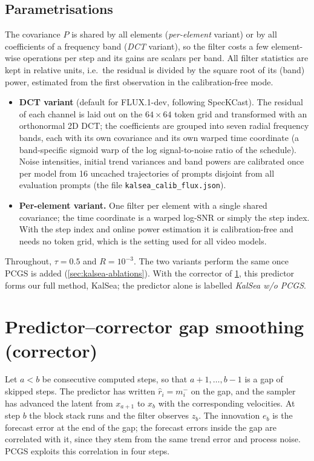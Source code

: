 \subsection{Parametrisations}
The covariance $P$ is shared by all elements (\emph{per-element} variant) or by all coefficients of a frequency band (\emph{DCT} variant), so the filter costs a few element-wise operations per step and its gains are scalars per band. All filter statistics are kept in relative units, i.e.\ the residual is divided by the square root of its (band) power, estimated from the first observation in the calibration-free mode.
\begin{itemize}
  \item \textbf{DCT variant} (default for FLUX.1-dev, following SpecKCast). The residual of each channel is laid out on the $64\times64$ token grid and transformed with an orthonormal 2D DCT; the coefficients are grouped into seven radial frequency bands, each with its own covariance and its own warped time coordinate (a band-specific sigmoid warp of the log signal-to-noise ratio of the schedule). Noise intensities, initial trend variances and band powers are calibrated once per model from 16 uncached trajectories of prompts disjoint from all evaluation prompts (the file \texttt{kalsea\_calib\_flux.json}).
  \item \textbf{Per-element variant.} One filter per element with a single shared covariance; the time coordinate is a warped log-SNR or simply the step index. With the step index and online power estimation it is calibration-free and needs no token grid, which is the setting used for all video models.
\end{itemize}
Throughout, $\tau=0.5$ and $R=10^{-3}$. The two variants perform the same once PCGS is added (\cref{sec:kalsea-ablations}). With the corrector of \cref{sec:kalsea-pcgs}, this predictor forms our full method, KalSea; the predictor alone is labelled \emph{KalSea w/o PCGS}.

\section{Predictor--corrector gap smoothing (corrector)}\label{sec:kalsea-pcgs}

Let $a<b$ be consecutive computed steps, so that $a{+}1,\dots,b{-}1$ is a gap of skipped steps. The predictor has written $\hat r_i = m^-_i$ on the gap, and the sampler has advanced the latent from $x_{a+1}$ to $x_b$ with the corresponding velocities. At step $b$ the block stack runs and the filter observes $z_b$. The innovation $e_b$ is the forecast error at the end of the gap; the forecast errors inside the gap are correlated with it, since they stem from the same trend error and process noise. PCGS exploits this correlation in four steps.

